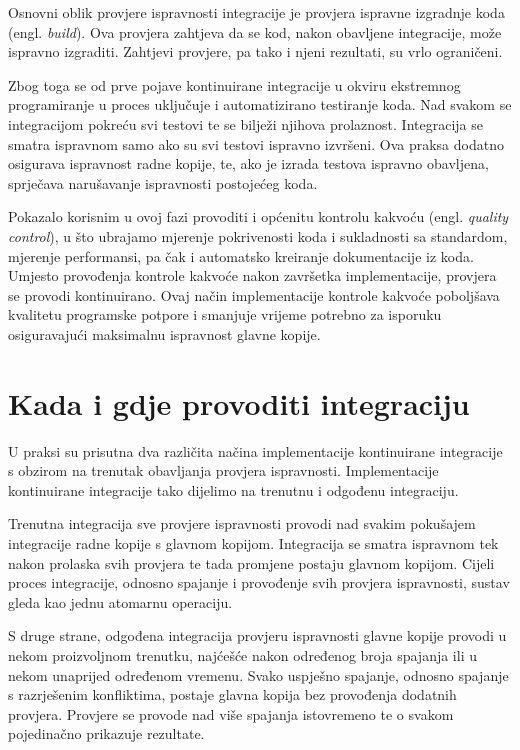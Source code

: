 \documentclass[times, utf8, seminar, numeric]{fer}
\newcommand{\eng}[1]{(engl. \textit{#1})}
\begin{document}
Osnovni oblik provjere ispravnosti integracije je provjera ispravne izgradnje koda \eng{build}. Ova provjera zahtjeva da se kod, nakon obavljene integracije, može ispravno izgraditi. Zahtjevi provjere, pa tako i njeni rezultati, su vrlo ograničeni.

Zbog toga se od prve pojave kontinuirane integracije u okviru ekstremnog programiranje u proces uključuje i automatizirano testiranje koda. Nad svakom se integracijom pokreću svi testovi te se bilježi njihova prolaznost. Integracija se smatra ispravnom samo ako su svi testovi ispravno izvršeni. Ova praksa dodatno osigurava ispravnost radne kopije, te, ako je izrada testova ispravno obavljena, sprječava narušavanje ispravnosti postojećeg koda.

Pokazalo korisnim u ovoj fazi provoditi i općenitu kontrolu kakvoću \eng{quality control}, u što ubrajamo mjerenje pokrivenosti koda i sukladnosti sa standardom, mjerenje performansi, pa čak i automatsko kreiranje dokumentacije iz koda. Umjesto provođenja kontrole kakvoće nakon završetka implementacije, provjera se provodi kontinuirano. Ovaj način implementacije kontrole kakvoće poboljšava kvalitetu programske potpore i smanjuje vrijeme potrebno za isporuku osiguravajući maksimalnu ispravnost glavne kopije.

\section{Kada i gdje provoditi integraciju}
U praksi su prisutna dva različita načina implementacije kontinuirane integracije s obzirom na trenutak obavljanja provjera ispravnosti. Implementacije kontinuirane integracije tako dijelimo na trenutnu i odgođenu integraciju.

Trenutna integracija sve provjere ispravnosti provodi nad svakim pokušajem integracije radne kopije s glavnom kopijom. Integracija se smatra ispravnom tek nakon prolaska svih provjera te tada promjene postaju glavnom kopijom. Cijeli proces integracije, odnosno spajanje i provođenje svih provjera ispravnosti, sustav gleda kao jednu atomarnu operaciju. 

S druge strane, odgođena integracija provjeru ispravnosti glavne kopije provodi u nekom proizvoljnom trenutku, najćešće nakon određenog broja spajanja ili u nekom unaprijed određenom vremenu. Svako uspješno spajanje, odnosno spajanje s razrješenim konfliktima, postaje glavna kopija bez provođenja dodatnih provjera. Provjere se provode nad više spajanja istovremeno te o svakom pojedinačno prikazuje rezultate.
\end{document}
